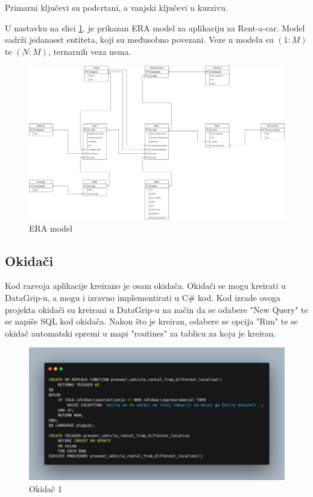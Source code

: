 \documentclass[]{foi}
\begin{document}
Primarni ključevi su podcrtani, a vanjski ključevi u kurzivu.

U nastavku na slici \ref{fig:era}. je prikazan ERA model za aplikaciju za Rent-a-car. Model sadrži jedanaest entiteta, koji su međusobno povezani. Veze u modelu su $(1:M)$ te $(N:M)$, ternarnih veza nema.

\begin{figure}
    \centering
    \includegraphics[width=1\textwidth]{slike/era.png}
    \caption{ERA model}
    \label{fig:era}
\end{figure}
\newpage

\subsection{Okidači}

Kod razvoja aplikacije kreirano je osam okidača. Okidači se mogu kreirati u DataGrip-u, a mogu i izravno implementirati u C\# kod. Kod izrade ovoga projekta okidači su kreirani u DataGrip-u na način da se odabere "New Query" te se napiše SQL kod okidača. Nakon što je kreiran, odabere se opcija "Run" te se okidač automatski spremi u mapi "routines" za tablicu za koju je kreiran.\\

\begin{figure}[!ht]
    \centering
    \includegraphics[width=1\textwidth]{slike/1.png}
    \caption{Okidač 1}
    \label{fig:prvi}
\end{figure}
\end{document}

